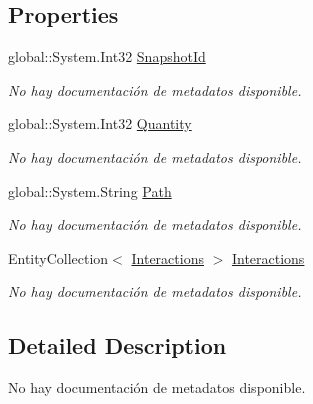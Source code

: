 \subsection*{Properties}
\begin{DoxyCompactItemize}
\item 
global\-::\-System.\-Int32 \hyperlink{class_game_memory_1_1_snapshots_ae7206905beee36fb1e969c02a263aa0f}{Snapshot\-Id}
\begin{DoxyCompactList}\small\item\em No hay documentación de metadatos disponible. \end{DoxyCompactList}\item 
global\-::\-System.\-Int32 \hyperlink{class_game_memory_1_1_snapshots_ac4c2dd5b199a89212283b3ea085db5c9}{Quantity}
\begin{DoxyCompactList}\small\item\em No hay documentación de metadatos disponible. \end{DoxyCompactList}\item 
global\-::\-System.\-String \hyperlink{class_game_memory_1_1_snapshots_abb210bf16aaff23bec1a023f5fcbd2f3}{Path}
\begin{DoxyCompactList}\small\item\em No hay documentación de metadatos disponible. \end{DoxyCompactList}\item 
Entity\-Collection$<$ \hyperlink{class_game_memory_1_1_interactions}{Interactions} $>$ \hyperlink{class_game_memory_1_1_snapshots_a24c7654eba40312f235c515e732088dc}{Interactions}
\begin{DoxyCompactList}\small\item\em No hay documentación de metadatos disponible. \end{DoxyCompactList}\end{DoxyCompactItemize}


\subsection{Detailed Description}
No hay documentación de metadatos disponible. 



